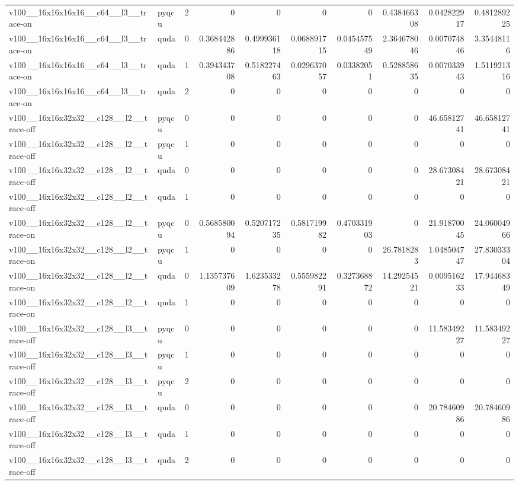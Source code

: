 \begin{table}[htbp]
\begin{tabular}{@{}llrrrrrrrr@{}}
v100\_\_16x16x16x16\_\_c64\_\_l3\_\_trace-on & pyqcu & 2 & 0 & 0 & 0 & 0 & 0.438466308 & 0.042822917 & 0.481289225 \\
v100\_\_16x16x16x16\_\_c64\_\_l3\_\_trace-on & quda & 0 & 0.368442886 & 0.499936118 & 0.068891715 & 0.045457549 & 2.364678046 & 0.007074846 & 3.35448116 \\
v100\_\_16x16x16x16\_\_c64\_\_l3\_\_trace-on & quda & 1 & 0.394343708 & 0.518227463 & 0.029637057 & 0.03382051 & 0.528858635 & 0.007033943 & 1.511921316 \\
v100\_\_16x16x16x16\_\_c64\_\_l3\_\_trace-on & quda & 2 & 0 & 0 & 0 & 0 & 0 & 0 & 0 \\
v100\_\_16x16x32x32\_\_c128\_\_l2\_\_trace-off & pyqcu & 0 & 0 & 0 & 0 & 0 & 0 & 46.65812741 & 46.65812741 \\
v100\_\_16x16x32x32\_\_c128\_\_l2\_\_trace-off & pyqcu & 1 & 0 & 0 & 0 & 0 & 0 & 0 & 0 \\
v100\_\_16x16x32x32\_\_c128\_\_l2\_\_trace-off & quda & 0 & 0 & 0 & 0 & 0 & 0 & 28.67308421 & 28.67308421 \\
v100\_\_16x16x32x32\_\_c128\_\_l2\_\_trace-off & quda & 1 & 0 & 0 & 0 & 0 & 0 & 0 & 0 \\
v100\_\_16x16x32x32\_\_c128\_\_l2\_\_trace-on & pyqcu & 0 & 0.568580094 & 0.520717235 & 0.581719982 & 0.470331903 & 0 & 21.91870045 & 24.06004966 \\
v100\_\_16x16x32x32\_\_c128\_\_l2\_\_trace-on & pyqcu & 1 & 0 & 0 & 0 & 0 & 26.7818283 & 1.048504747 & 27.83033304 \\
v100\_\_16x16x32x32\_\_c128\_\_l2\_\_trace-on & quda & 0 & 1.135737609 & 1.623533278 & 0.555982291 & 0.327368872 & 14.29254521 & 0.009516233 & 17.94468349 \\
v100\_\_16x16x32x32\_\_c128\_\_l2\_\_trace-on & quda & 1 & 0 & 0 & 0 & 0 & 0 & 0 & 0 \\
v100\_\_16x16x32x32\_\_c128\_\_l3\_\_trace-off & pyqcu & 0 & 0 & 0 & 0 & 0 & 0 & 11.58349227 & 11.58349227 \\
v100\_\_16x16x32x32\_\_c128\_\_l3\_\_trace-off & pyqcu & 1 & 0 & 0 & 0 & 0 & 0 & 0 & 0 \\
v100\_\_16x16x32x32\_\_c128\_\_l3\_\_trace-off & pyqcu & 2 & 0 & 0 & 0 & 0 & 0 & 0 & 0 \\
v100\_\_16x16x32x32\_\_c128\_\_l3\_\_trace-off & quda & 0 & 0 & 0 & 0 & 0 & 0 & 20.78460986 & 20.78460986 \\
v100\_\_16x16x32x32\_\_c128\_\_l3\_\_trace-off & quda & 1 & 0 & 0 & 0 & 0 & 0 & 0 & 0 \\
v100\_\_16x16x32x32\_\_c128\_\_l3\_\_trace-off & quda & 2 & 0 & 0 & 0 & 0 & 0 & 0 & 0 \\

\end{tabular}
\end{table}
